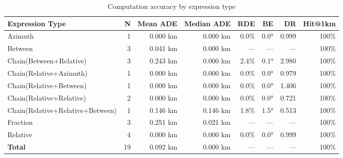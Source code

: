 \begin{table}[htbp]
\centering
\caption{Computation accuracy by expression type}
\label{tab:accuracy}
\begin{tabular}{lrrrrrrr}
\hline
Expression Type & N & Mean ADE & Median ADE & RDE & BE & DR & Hit@1km \\
\hline
Azimuth & 1 & 0.000 km & 0.000 km & 0.0\% & 0.0° & 0.999 & 100\% \\
Between & 3 & 0.041 km & 0.000 km & --- & --- & --- & 100\% \\
Chain(Between+Relative) & 3 & 0.243 km & 0.000 km & 2.4\% & 0.1° & 2.980 & 100\% \\
Chain(Relative+Azimuth) & 1 & 0.000 km & 0.000 km & 0.0\% & 0.0° & 0.979 & 100\% \\
Chain(Relative+Between) & 1 & 0.000 km & 0.000 km & 0.0\% & 0.0° & 1.406 & 100\% \\
Chain(Relative+Relative) & 2 & 0.000 km & 0.000 km & 0.0\% & 0.0° & 0.721 & 100\% \\
Chain(Relative+Relative+Between) & 1 & 0.146 km & 0.146 km & 1.8\% & 1.5° & 0.513 & 100\% \\
Fraction & 3 & 0.251 km & 0.021 km & --- & --- & --- & 100\% \\
Relative & 4 & 0.000 km & 0.000 km & 0.0\% & 0.0° & 0.999 & 100\% \\
\hline
\textbf{Total} & 19 & 0.092 km & 0.000 km & --- & --- & --- & 100\% \\
\hline
\end{tabular}
\end{table}